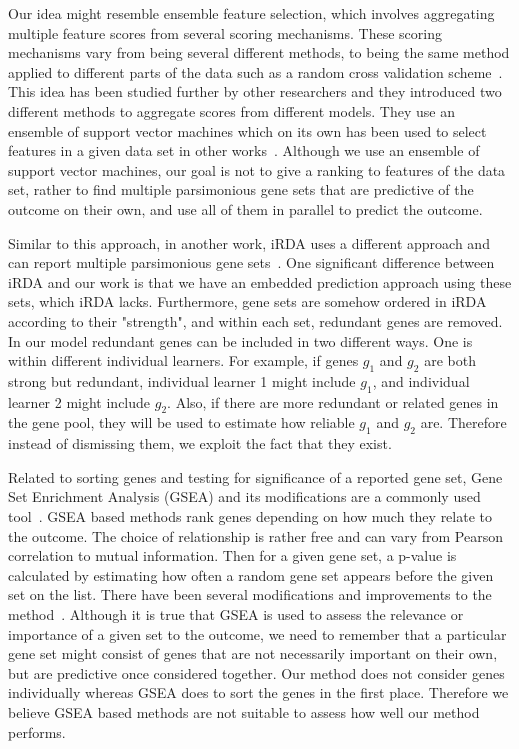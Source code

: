Our idea might resemble ensemble feature selection, which involves
aggregating multiple feature scores from several scoring
mechanisms. These scoring mechanisms vary from being several different
methods, to being the same method applied to different parts of the data such as a random cross validation scheme~\cite{saeys2008robust}. This idea has been studied further by other researchers and they introduced two different methods to aggregate scores from different models. They use an ensemble of support vector machines which on its own has been used to select features in a given data set in other works~\cite{guyon2002gene}. Although we use an ensemble of support vector machines, our goal is not to give a ranking to features of the data set, rather to find multiple parsimonious gene sets that are predictive of the outcome on their own, and use all of them in parallel to predict the outcome. 

Similar to this approach, in another work, iRDA uses a different approach and can report multiple parsimonious gene sets~\cite{lai2015irda}. One significant difference between iRDA and our work is that we have an embedded prediction approach using these sets, which iRDA lacks. Furthermore, gene sets are somehow ordered in iRDA according to their "strength", and within each set, redundant genes are removed. In our model redundant genes can be included in two different ways. One is within different individual learners. For example, if genes $g_1$ and $g_2$ are both strong but redundant, individual learner 1 might include $g_1$, and individual learner 2 might include $g_2$. Also, if there are more redundant or related genes in the gene pool, they will be used to estimate how reliable $g_1$ and $g_2$ are. Therefore instead of dismissing them, we exploit the fact that they exist. 

Related to sorting genes and testing for significance of a reported gene set, Gene Set Enrichment Analysis (GSEA) and its modifications are a commonly used tool~\cite{shi2007gene, subramanian2005gene}. GSEA based methods rank genes depending on how much they relate to the outcome. The choice of relationship is rather free and can vary from Pearson correlation to mutual information. Then for a given gene set, a p-value is calculated by estimating how often a random gene set appears before the given set on the list. There have been several modifications and improvements to the method~\cite{nam2008gene, dopazo2006functional}. Although it is true that GSEA is used to assess the relevance or importance of a given set to the outcome, we need to remember that a particular gene set might consist of genes that are not necessarily important on their own, but are predictive once considered together. Our method does not consider genes individually whereas GSEA does to sort the genes in the first place. Therefore we believe GSEA based methods are not suitable to assess how well our method performs.

